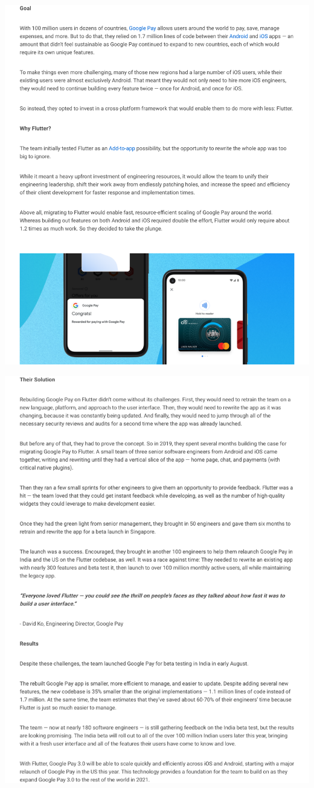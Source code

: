 \Continuing
\begin{center}
    \includegraphics[width=40em]{flutter-google-pay-p2}
\end{center}
\WillContinue
\pagebreak

\Continuing
\begin{center}
    \includegraphics[width=40em]{flutter-google-pay-p3}
\end{center}

\pagebreak
